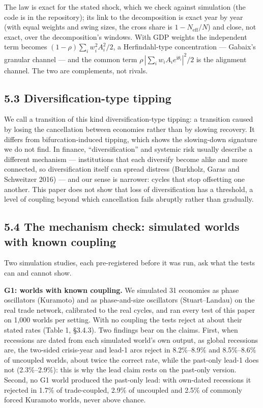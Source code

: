 \documentclass[11pt,a4paper]{article}
\begin{document}
The law is exact for the stated shock, which we check against simulation (the code is in the repository); its link to the decomposition is exact year by year (with equal weights and swing sizes, the cross share is \(1 - N_{\mathrm{eff}}/N\)) and close, not exact, over the decomposition's windows. With GDP weights the independent term becomes \((1-\rho)\sum_i w_i^2A_i^2/2\), a Herfindahl-type concentration — Gabaix's granular channel — and the common term \(\rho\,|\sum_i w_iA_ie^{\mathrm{i}\theta_i}|^2/2\) is the alignment channel. The two are complements, not rivals.

\subsection{5.3 Diversification-type tipping}\label{diversification-type-tipping}

We call a transition of this kind diversification-type tipping: a transition caused by losing the cancellation between economies rather than by slowing recovery. It differs from bifurcation-induced tipping, which shows the slowing-down signature we do not find. In finance, ``diversification'' and systemic risk usually describe a different mechanism — institutions that each diversify become alike and more connected, so diversification itself can spread distress (Burkholz, Garas and Schweitzer 2016) — and our sense is narrower: cycles that stop offsetting one another. This paper does not show that loss of diversification has a threshold, a level of coupling beyond which cancellation fails abruptly rather than gradually.

\subsection{5.4 The mechanism check: simulated worlds with known coupling}\label{the-mechanism-check-simulated-worlds-with-known-coupling}

Two simulation studies, each pre-registered before it was run, ask what the tests can and cannot show.

\textbf{G1: worlds with known coupling.} We simulated 31 economies as phase oscillators (Kuramoto) and as phase-and-size oscillators (Stuart–Landau) on the real trade network, calibrated to the real cycles, and ran every test of this paper on 1,000 worlds per setting. With no coupling the tests reject at about their stated rates (Table 1, §3.4.3). Two findings bear on the claims. First, when recessions are dated from each simulated world's own output, as global recessions are, the two-sided crisis-year and lead-1 arcs reject in 8.2\%–8.9\% and 8.5\%–8.6\% of uncoupled worlds, about twice the correct rate, while the past-only lead-1 does not (2.3\%–2.9\%): this is why the lead claim rests on the past-only version. Second, no G1 world produced the past-only lead: with own-dated recessions it rejected in 1.7\% of trade-coupled, 2.9\% of uncoupled and 2.5\% of commonly forced Kuramoto worlds, never above chance.
\end{document}
